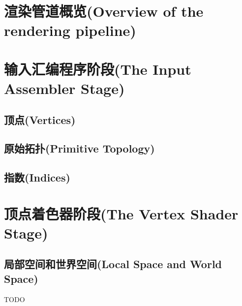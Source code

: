 \section{渲染管道概览(Overview of the rendering pipeline)}
\section{输入汇编程序阶段(The Input Assembler Stage)}
\subsection{顶点(Vertices)}
\subsection{原始拓扑(Primitive Topology)}
\subsection{指数(Indices)}
\section{顶点着色器阶段(The Vertex Shader Stage)}
\subsection{局部空间和世界空间(Local Space and World Space)}
TODO
